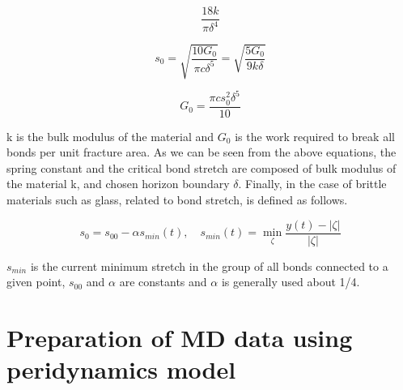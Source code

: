 \begin{equation}
\frac{18k}{\pi\delta^4}
\end{equation}

 \begin{equation}
s_0=\sqrt{\frac{10G_0}{\pi c\delta^5}}=\sqrt{\frac{5G_0}{9 k\delta}}
\end{equation}

 \begin{equation}
G_0=\frac{\pi cs_0^2\delta^5}{10} 
\end{equation}

k is the bulk modulus of the material and $G_0$ is the work required to break all bonds per unit fracture area. As we can be seen from the above equations, the spring constant and the critical bond stretch are composed of bulk modulus of the material k, and chosen horizon boundary $\delta$. Finally, in the case of brittle materials such as glass, related to bond stretch, is defined as follows.

 \begin{equation}
s_0=s_{00}-\alpha s_{min}(t), \quad s_{min}(t)=\min_\zeta{\frac{y(t)-|\zeta|}{|\zeta|}}
\end{equation}

$s_{min}$ is the current minimum stretch in the group of all bonds connected to a given point, $s_{00}$ and $\alpha$ are constants and $\alpha$ is generally used about 1/4. 

\section{Preparation of MD data using peridynamics model }
\label{sec:3}

